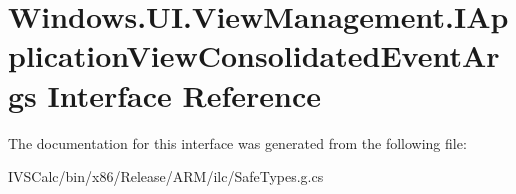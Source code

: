 \hypertarget{interface_windows_1_1_u_i_1_1_view_management_1_1_i_application_view_consolidated_event_args}{}\section{Windows.\+U\+I.\+View\+Management.\+I\+Application\+View\+Consolidated\+Event\+Args Interface Reference}
\label{interface_windows_1_1_u_i_1_1_view_management_1_1_i_application_view_consolidated_event_args}


The documentation for this interface was generated from the following file\+:\begin{DoxyCompactItemize}
\item 
I\+V\+S\+Calc/bin/x86/\+Release/\+A\+R\+M/ilc/Safe\+Types.\+g.\+cs\end{DoxyCompactItemize}
